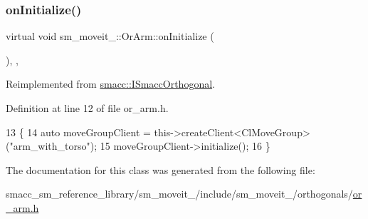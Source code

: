 \subsubsection{\texorpdfstring{on\+Initialize()}{onInitialize()}}
{\footnotesize\ttfamily virtual void sm\+\_\+moveit\+\_\+::\+Or\+Arm\+::on\+Initialize (\begin{DoxyParamCaption}{ }\end{DoxyParamCaption})\hspace{0.3cm}{\ttfamily [inline]}, {\ttfamily [override]}, {\ttfamily [virtual]}}



Reimplemented from \hyperlink{classsmacc_1_1ISmaccOrthogonal_a6bb31c620cb64dd7b8417f8705c79c7a}{smacc\+::\+I\+Smacc\+Orthogonal}.



Definition at line 12 of file or\+\_\+arm.\+h.


\begin{DoxyCode}
13     \{
14         \textcolor{keyword}{auto} moveGroupClient = this->createClient<ClMoveGroup>(\textcolor{stringliteral}{"arm\_with\_torso"});
15         moveGroupClient->initialize();
16     \}
\end{DoxyCode}


The documentation for this class was generated from the following file\+:\begin{DoxyCompactItemize}
\item 
smacc\+\_\+sm\+\_\+reference\+\_\+library/sm\+\_\+moveit\+\_/include/sm\+\_\+moveit\+\_/orthogonals/\hyperlink{4_2include_2sm__moveit__4_2orthogonals_2or__arm_8h}{or\+\_\+arm.\+h}\end{DoxyCompactItemize}
